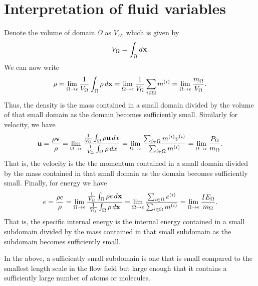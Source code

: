 \documentclass[oneside,a4paper,11pt]{report}
\begin{document}
\section{Interpretation of fluid variables}
\label{sec:atomistic_representation}
Denote the volume of domain $\Omega$ as $V_\Omega$, which is given by
\begin{equation}
    V_\Omega = \int_\Omega d\mathbf{x}.
\end{equation}
We can now write
\begin{equation}
    \label{eq:atomistic_rho}
    \rho = \lim_{\Omega \to \epsilon} \frac{1}{V_\Omega} \int_\Omega \rho \, d\mathbf{x} = \lim_{\Omega \to \epsilon} \frac{1}{V_\Omega} \sum_{i \in \Omega} m^{(i)} = \lim_{\Omega \to \epsilon} \frac{m_\Omega}{V_\Omega}.
\end{equation}
Thus, the density is the mass contained in a small domain divided by the volume of that small domain as the domain becomes sufficiently small. Similarly for velocity, we have
\begin{equation}
    \label{eq:atomistic_u}
    \mathbf{u} = \frac{\rho\mathbf{v}}{\rho} = \lim_{\Omega \to \epsilon} \frac{\frac{1}{V_\Omega} \int_\Omega \rho \mathbf{u} \, dx}{\frac{1}{V_\Omega} \int_\Omega \rho \, dx} = \lim_{\Omega \to \epsilon} \frac{ \sum_{i \in \Omega} m^{(i)} v^{(i)} }{ \sum_{i \in \Omega} m^{(i)} } = \lim_{\Omega \to \epsilon} \frac{ P_\Omega }{ m_\Omega }.
\end{equation}
That is, the velocity is the the momentum contained in a small domain divided by the mass contained in that small domain as the domain becomes sufficiently small. Finally, for energy we have
\begin{equation}
    \label{eq:atomistic_e}
    e = \frac{\rho e}{\rho} = \lim_{\Omega \to \epsilon} \frac{ \frac{1}{V_\Omega} \int_\Omega \rho e \, d\mathbf{x}}{ \frac{1}{V_\Omega} \int_\Omega \rho \, d\mathbf{x}} = \lim_{\Omega \to \epsilon} \frac{ \sum_{i \in \Omega} e^{(i)} }{ \sum_{i \in \Omega} m^{(i)} } = \lim_{
        \Omega \to \epsilon} \frac{ IE_\Omega }{ m_\Omega }.
\end{equation}
That is, the specific internal energy is the internal energy contained in a small subdomain divided by the mass contained in that small subdomain as the subdomain becomes sufficiently small.

In the above, a sufficiently small subdomain is one that is small compared to the smallest length scale in the flow field but large enough that it contains a sufficiently large number of atoms or molecules.
\end{document}
